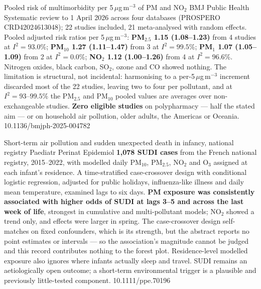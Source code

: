 \documentclass[10pt]{article}
\begin{document}

{Pooled risk of multimorbidity per 5\,$\mu$g\,m$^{-3}$ of PM and NO$_2$}
{BMJ Public Health}
{Systematic review to 1 April 2026 across four databases (PROSPERO CRD42024613048); 22
studies included, 21 meta-analysed with random effects. Pooled adjusted risk ratios per
5\,$\mu$g\,m$^{-3}$: \textbf{PM$_{2.5}$ 1.15 (1.08--1.23)} from 4 studies at $I^2=93.0\%$;
\textbf{PM$_{10}$ 1.27 (1.11--1.47)} from 3 at $I^2=99.5\%$; \textbf{PM$_1$ 1.07
(1.05--1.09)} from 2 at $I^2=0.0\%$; \textbf{NO$_2$ 1.12 (1.00--1.26)} from 4 at
$I^2=96.6\%$. Nitrogen oxides, black carbon, SO$_2$, ozone and CO showed nothing. The
limitation is structural, not incidental: harmonising to a per-5\,$\mu$g\,m$^{-3}$ increment
discarded most of the 22 studies, leaving two to four per pollutant, and at
$I^2=93$--$99.5\%$ the PM$_{2.5}$ and PM$_{10}$ pooled values are averages over
non-exchangeable studies. \textbf{Zero eligible studies} on polypharmacy --- half the stated
aim --- or on household air pollution, older adults, the Americas or Oceania.}
{10.1136/bmjph-2025-004782}


{Short-term air pollution and sudden unexpected death in infancy, national registry}
{Paediatr Perinat Epidemiol}
{\textbf{1{,}078 SUDI cases} from the French national registry, 2015--2022, with modelled
daily PM$_{10}$, PM$_{2.5}$, NO$_2$ and O$_3$ assigned at each infant's residence. A
time-stratified case-crossover design with conditional logistic regression, adjusted for
public holidays, influenza-like illness and daily mean temperature, examined lags to six
days. \textbf{PM exposure was consistently associated with higher odds of SUDI at lags 3--5
and across the last week of life}, strongest in cumulative and multi-pollutant models; NO$_2$
showed a trend only, and effects were larger in spring. The case-crossover design
self-matches on fixed confounders, which is its strength, but the abstract reports no point
estimates or intervals --- so the association's magnitude cannot be judged and this record
contributes nothing to the forest plot. Residence-level modelled exposure also ignores where
infants actually sleep and travel. SUDI remains an aetiologically open outcome; a short-term
environmental trigger is a plausible and previously little-tested component.}
{10.1111/ppe.70196}
\end{document}
